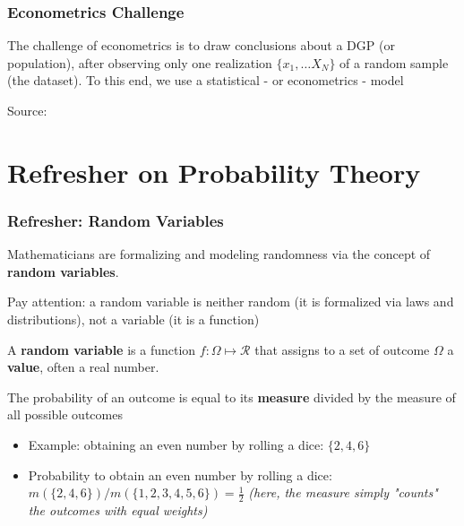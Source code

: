 \documentclass{beamer}
\newenvironment{wideitemize}{\itemize\addtolength{\itemsep}{10pt}}{\enditemize}
\begin{document}
\begin{frame}
  \frametitle{Econometrics Challenge}
  The challenge of econometrics is to draw conclusions about a DGP (or population), after observing only one realization $\{x_1, \dots X_N\}$ of a random sample (the dataset). To this end, we use a statistical - or econometrics - model\\

\medskip
  
    \hspace*{15pt}\hbox{\scriptsize Source:}
    
\end{frame}

\section{Refresher on Probability Theory}
\begin{frame}
  \frametitle{Refresher: Random Variables}
  \begin{wideitemize}
  \item Mathematicians are formalizing and modeling randomness via the concept of \textbf{random variables}.\\
  \item Pay attention: a random variable is neither random (it is formalized via laws and distributions), not a variable (it is a function)
  \item A \textbf{random variable} is a function $f: \Omega \mapsto \mathcal{R}$ that assigns to
      a set of outcome $\Omega$ a \textbf{value}, often a real number.
  \item The probability of an outcome is equal to its \textbf{measure} divided by
        the measure of all possible outcomes
     \begin{itemize}
      \item Example: obtaining an even number by rolling a dice: $\{2, 4, 6\}$
      \item Probability to obtain an even number by rolling a dice: $m(\{2, 4,
        6\})/m(\{1, 2, 3, 4, 5, 6\}) = \frac{1}{2}$ \emph{(here, the measure
          simply "counts" the outcomes with equal weights)}
        \end{itemize}     
  \end{wideitemize}  
\end{frame}
\end{document}
